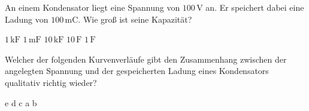 \documentclass[11pt]{exam}
\begin{document}
\begin{questions}
\vspace{3mm}\question An einem Kondensator liegt eine Spannung von \(\mathrm{100\,V}\) an. Er speichert dabei eine Ladung von \(\mathrm{100\,mC}\). Wie groß ist seine Kapazität?

\begin{choices}
	\choice \(\mathrm{1\,kF}\)
	\choice \(\mathrm{1\,mF}\)
	\choice \(\mathrm{10\,kF}\)
	\choice \(\mathrm{10\,F}\)
	\choice \(\mathrm{1\,F}\)
\end{choices}

\vspace{3mm}\question Welcher der folgenden Kurvenverläufe gibt den Zusammenhang zwischen der angelegten Spannung und der gespeicherten Ladung eines Kondensators qualitativ richtig wieder?

\begin{choices}
	\choice e
	\choice d
	\choice c
	\choice a
	\choice b
\end{choices}

\vspace{3mm}\end{questions}
\end{document}
